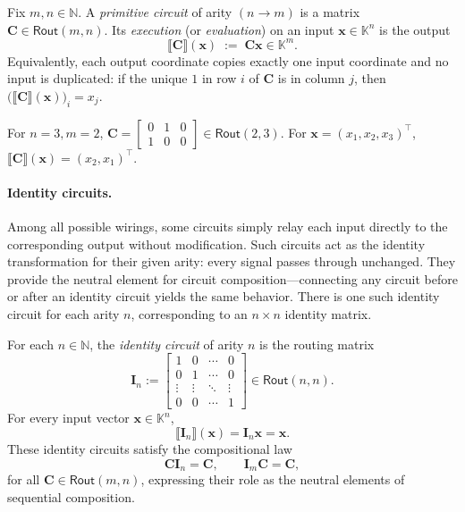 \documentclass{article}
\newcommand{\K}{\mathbb{K}}                  %
\newcommand{\N}{\mathbb{N}}                  %
\newcommand{\vect}[1]{\mathbf{#1}}           %
\newcommand{\mat}[1]{\mathbf{#1}}            %
\newcommand{\id}{\mat{I}}                    %
\newcommand{\Rout}[2]{\mathsf{Rout}(#1,#2)}
\begin{document}
\begin{definition}
Fix $m,n\in\N$. A \emph{primitive circuit} of arity $(n\!\to\! m)$ is a matrix $\mat{C}\in\Rout{m}{n}$. 
Its \emph{execution} (or \emph{evaluation}) on an input $\vect{x}\in\K^{n}$ is the output
\[
\llbracket \mat{C}\rrbracket(\vect{x})\;:=\;\mat{C}\vect{x}\in\K^{m}.
\]
Equivalently, each output coordinate copies exactly one input coordinate and no input is duplicated: if the unique $1$ in row $i$ of $\mat{C}$ is in column $j$, then $\bigl(\llbracket \mat{C}\rrbracket(\vect{x})\bigr)_{i}=x_{j}$.
\end{definition}

\begin{examples}
For $n=3,m=2$, 
$\displaystyle \mat{C}=\begin{bmatrix}0&1&0\\ 1&0&0\end{bmatrix}\in\Rout{2}{3}$.
For $\vect{x}=(x_1,x_2,x_3)^\top$, $\llbracket \mat{C}\rrbracket(\vect{x})=(x_2,x_1)^\top$.
\end{examples}

\paragraph{Identity circuits.}
Among all possible wirings, some circuits simply relay each input directly to the corresponding output without modification.  
Such circuits act as the identity transformation for their given arity: every signal passes through unchanged.  
They provide the neutral element for circuit composition—connecting any circuit before or after an identity circuit yields the same behavior.  
There is one such identity circuit for each arity \(n\), corresponding to an \(n\times n\) identity matrix.

\begin{definition}
For each \(n\in\N\), the \emph{identity circuit} of arity \(n\) is the routing matrix
\[
\id_n := \begin{bmatrix}
1 & 0 & \cdots & 0\\
0 & 1 & \cdots & 0\\
\vdots & \vdots & \ddots & \vdots\\
0 & 0 & \cdots & 1
\end{bmatrix} \in \Rout{n}{n}.
\]
For every input vector \(\vect{x}\in\K^{n}\),
\[
\llbracket \id_n \rrbracket(\vect{x}) = \id_n \vect{x} = \vect{x}.
\]
These identity circuits satisfy the compositional law
\[
\mat{C}\id_n = \mat{C}, \qquad
\id_m\mat{C} = \mat{C},
\]
for all \(\mat{C}\in\Rout{m}{n}\), expressing their role as the neutral elements of sequential composition.
\end{definition}
\end{document}

